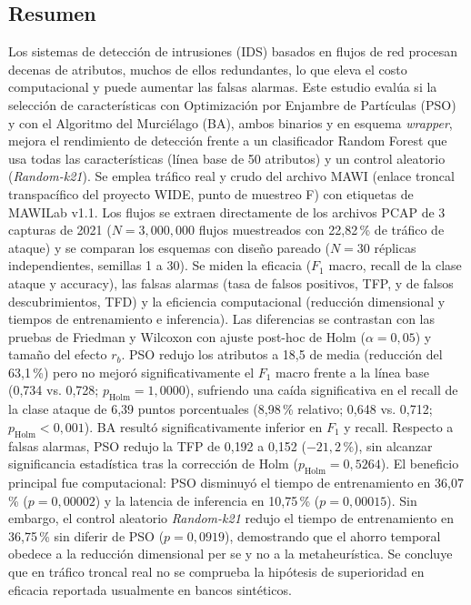 \documentclass[11pt,a4paper]{article}
\begin{document}
\subsection*{Resumen}
Los sistemas de detección de intrusiones (IDS) basados en flujos de red procesan decenas de atributos, muchos de ellos redundantes, lo que eleva el costo computacional y puede aumentar las falsas alarmas. Este estudio evalúa si la selección de características con Optimización por Enjambre de Partículas (PSO) y con el Algoritmo del Murciélago (BA), ambos binarios y en esquema \emph{wrapper}, mejora el rendimiento de detección frente a un clasificador Random Forest que usa todas las características (línea base de 50 atributos) y un control aleatorio (\emph{Random-k21}). Se emplea tráfico real y crudo del archivo MAWI (enlace troncal transpacífico del proyecto WIDE, punto de muestreo F) con etiquetas de MAWILab v1.1. Los flujos se extraen directamente de los archivos PCAP de 3 capturas de 2021 ($N = 3{,}000{,}000$ flujos muestreados con 22,82\,\% de tráfico de ataque) y se comparan los esquemas con diseño pareado ($N = 30$ réplicas independientes, semillas 1 a 30). Se miden la eficacia ($F_1$ macro, recall de la clase ataque y accuracy), las falsas alarmas (tasa de falsos positivos, TFP, y de falsos descubrimientos, TFD) y la eficiencia computacional (reducción dimensional y tiempos de entrenamiento e inferencia). Las diferencias se contrastan con las pruebas de Friedman y Wilcoxon con ajuste post-hoc de Holm ($\alpha = 0{,}05$) y tamaño del efecto $r_b$. PSO redujo los atributos a 18,5 de media (reducción del 63,1\,\%) pero no mejoró significativamente el $F_1$ macro frente a la línea base (0,734 vs. 0,728; $p_{\text{Holm}} = 1{,}0000$), sufriendo una caída significativa en el recall de la clase ataque de 6,39 puntos porcentuales (8,98\,\% relativo; 0,648 vs. 0,712; $p_{\text{Holm}} < 0{,}001$). BA resultó significativamente inferior en $F_1$ y recall. Respecto a falsas alarmas, PSO redujo la TFP de 0,192 a 0,152 ($-21{,}2\,\%$), sin alcanzar significancia estadística tras la corrección de Holm ($p_{\text{Holm}} = 0{,}5264$). El beneficio principal fue computacional: PSO disminuyó el tiempo de entrenamiento en 36,07\,\% ($p = 0{,}00002$) y la latencia de inferencia en 10,75\,\% ($p = 0{,}00015$). Sin embargo, el control aleatorio \emph{Random-k21} redujo el tiempo de entrenamiento en 36,75\,\% sin diferir de PSO ($p = 0{,}0919$), demostrando que el ahorro temporal obedece a la reducción dimensional per se y no a la metaheurística. Se concluye que en tráfico troncal real no se comprueba la hipótesis de superioridad en eficacia reportada usualmente en bancos sintéticos.
\end{document}

